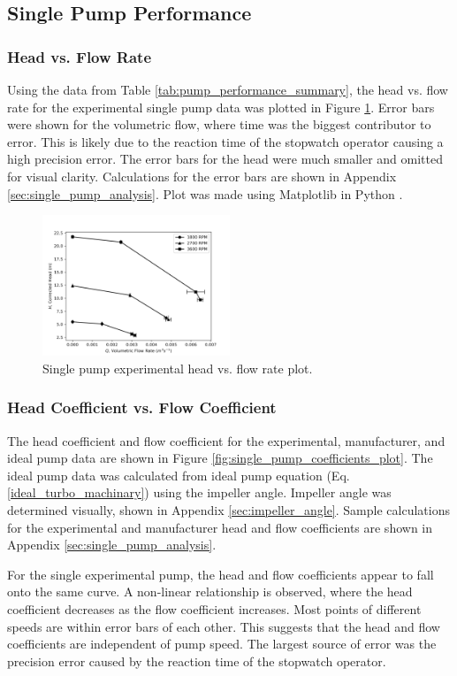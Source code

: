 \subsection{Single Pump Performance}
\subsubsection{Head vs. Flow Rate}
Using the data from Table \ref{tab:pump_performance_summary}, the head vs. flow rate for the experimental single pump data was plotted in Figure \ref{fig:single_pump_plot}. Error bars were shown for the volumetric flow, where time was the biggest contributor to error. This is likely due to the reaction time of the stopwatch operator causing a high precision error. The error bars for the head were much smaller and omitted for visual clarity. Calculations for the error bars are shown in Appendix \ref{sec:single_pump_analysis}. Plot was made using Matplotlib in Python \cite{Matplotlib}.
\begin{figure}[H]
    \centering
    \includegraphics[width=0.5\textwidth]{Sections/Figures/Single Pump Plot.png}
    \caption{Single pump experimental head vs. flow rate plot.}
    \label{fig:single_pump_plot}
\end{figure}

\subsubsection{Head Coefficient vs. Flow Coefficient}
The head coefficient and flow coefficient for the experimental, manufacturer, and ideal pump data are shown in Figure \ref{fig:single_pump_coefficients_plot}. The ideal pump data was calculated from ideal pump equation (Eq. \ref{ideal_turbo_machinary}) using the impeller angle. Impeller angle was determined visually, shown in Appendix \ref{sec:impeller_angle}. Sample calculations for the experimental and manufacturer head and flow coefficients are shown in Appendix \ref{sec:single_pump_analysis}.

For the single experimental pump, the head and flow coefficients appear to fall onto the same curve. A non-linear relationship is observed, where the head coefficient decreases as the flow coefficient increases. Most points of different speeds are within error bars of each other. This suggests that the head and flow coefficients are independent of pump speed. The largest source of error was the precision error caused by the reaction time of the stopwatch operator.

